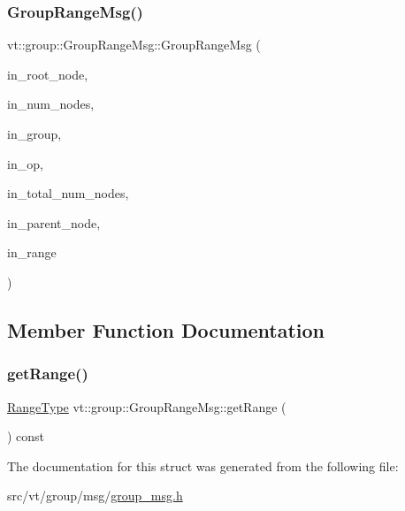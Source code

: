 \subsubsection{\texorpdfstring{Group\+Range\+Msg()}{GroupRangeMsg()}\hspace{0.1cm}{\footnotesize\ttfamily [2/2]}}
{\footnotesize\ttfamily vt\+::group\+::\+Group\+Range\+Msg\+::\+Group\+Range\+Msg (\begin{DoxyParamCaption}\item[{\hyperlink{namespacevt_a866da9d0efc19c0a1ce79e9e492f47e2}{Node\+Type} const \&}]{in\+\_\+root\+\_\+node,  }\item[{\hyperlink{namespacevt_a866da9d0efc19c0a1ce79e9e492f47e2}{Node\+Type} const \&}]{in\+\_\+num\+\_\+nodes,  }\item[{\hyperlink{namespacevt_a27b5e4411c9b6140c49100e050e2f743}{Group\+Type} const \&}]{in\+\_\+group,  }\item[{\hyperlink{namespacevt_1_1group_a73f2624ddeb535b39a08b6524f26b244}{Remote\+Operation\+I\+D\+Type}}]{in\+\_\+op,  }\item[{\hyperlink{namespacevt_a866da9d0efc19c0a1ce79e9e492f47e2}{Node\+Type} const \&}]{in\+\_\+total\+\_\+num\+\_\+nodes,  }\item[{\hyperlink{namespacevt_a866da9d0efc19c0a1ce79e9e492f47e2}{Node\+Type} const \&}]{in\+\_\+parent\+\_\+node,  }\item[{\hyperlink{structvt_1_1group_1_1_group_range_msg_a49fdcbb2ae53a4c5778e60f306c8f5e6}{Range\+Type} $\ast$}]{in\+\_\+range }\end{DoxyParamCaption})\hspace{0.3cm}{\ttfamily [inline]}}



\subsection{Member Function Documentation}
\mbox{\label{structvt_1_1group_1_1_group_range_msg_a9a3b75cee8d60df55ecf7c6f7a3772f1}} 
\subsubsection{\texorpdfstring{get\+Range()}{getRange()}}
{\footnotesize\ttfamily \hyperlink{structvt_1_1group_1_1_group_range_msg_a49fdcbb2ae53a4c5778e60f306c8f5e6}{Range\+Type} vt\+::group\+::\+Group\+Range\+Msg\+::get\+Range (\begin{DoxyParamCaption}{ }\end{DoxyParamCaption}) const\hspace{0.3cm}{\ttfamily [inline]}}



The documentation for this struct was generated from the following file\+:\begin{DoxyCompactItemize}
\item 
src/vt/group/msg/\hyperlink{group__msg_8h}{group\+\_\+msg.\+h}\end{DoxyCompactItemize}
